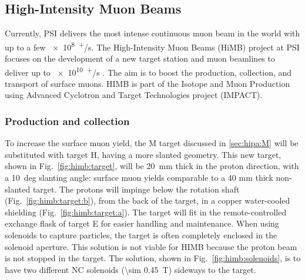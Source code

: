 \begin{refsection}
    \subsection{High-Intensity Muon Beams}
        Currently, PSI delivers the most intense continuous muon beam in the world with up to a few \SI{e8}{\upmu^+/s}.
        The High-Intensity Muon Beams (HiMB) project at PSI focuses on the development of a new target station and muon beamlines to deliver up to \SI{e10}{\upmu^+/s} \cite{HIMB:2021}\cite{HIMB:gio}.
        The aim is to boost the production, collection, and transport of surface muons.
        HIMB is part of the  Isotope and Muon Production using Advanced Cyclotron and Target Technologies project (IMPACT)\cite{impact}.

        \subsubsection{Production and collection}
        To increase the surface muon yield, the M target discussed in \ref{sec:hipa:M} will be substituted with target H, having a more slanted geometry.
        This new target, shown in Fig.~\ref{fig:himb:target}, will be \SI{20}{mm} thick in the proton direction, with a \SI{10}{deg} slanting angle: surface muon yields comparable to a 40 mm thick non-slanted target. 
        The protons will impinge below the rotation shaft (Fig.~\ref{fig:himb:target:b}), from the back of the target, in a copper water-cooled shielding (Fig.~\ref{fig:himb:target:a}).
        The target will fit in the remote-controlled exchange flask of target E for easier handling and maintenance.
        When using solenoids to capture particles, the target is often completely enclosed in the solenoid aperture. 
        This solution is not viable for HIMB because the proton beam is not stopped in the target. 
        The solution, shown in Fig.~\ref{fig:himb:solenoids}, is to have two different NC solenoids (\SI{\sim 0.45}{T}) sideways to the target.
        \begin{figure}
            \centering
\end{figure}
\end{refsection}

